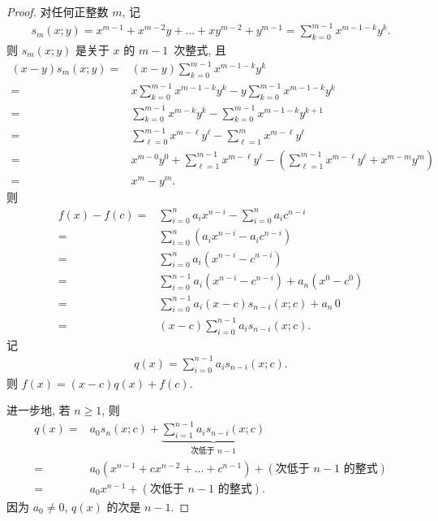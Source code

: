 \documentclass[../libro.tex]{subfiles}
\begin{document}
\begin{proof}
    对任何正整数 \(m\), 记
    \begin{align*}
        s_m (x; y)
        = x^{m-1} + x^{m-2} y + \dots + x y^{m-2} + y^{m-1}
        = \sum_{k = 0}^{m-1} {x^{m-1-k} y^k}.
    \end{align*}
    则 \(s_m (x; y)\) 是关于 \(x\) 的 \(m-1\)~次整式, 且
    \begin{align*}
        (x - y) s_m (x; y)
        = {} &
        (x - y) \sum_{k = 0}^{m-1} {x^{m-1-k} y^k}
        \\
        = {} &
        x \sum_{k = 0}^{m-1} {x^{m-1-k} y^k}
        - y \sum_{k = 0}^{m-1} {x^{m-1-k} y^k}
        \\
        = {} &
        \sum_{k = 0}^{m-1} {x^{m-k} y^k}
        - \sum_{k = 0}^{m-1} {x^{m-1-k} y^{k+1}}
        \\
        = {} &
        \sum_{\ell = 0}^{m-1} {x^{m-\ell} y^\ell}
        - \sum_{\ell = 1}^{m} {x^{m-\ell} y^\ell}
        \\
        = {} &
        x^{m-0} y^0 + \sum_{\ell = 1}^{m-1} {x^{m-\ell} y^\ell}
        - \left(
            \sum_{\ell = 1}^{m-1} {x^{m-\ell} y^\ell} + x^{m-m} y^m
        \right)
        \\
        = {} &
        x^m - y^m.
    \end{align*}
    则
    \begin{align*}
        f(x) - f(c)
        = {} &
        \sum_{i = 0}^{n} {a_i x^{n-i}}
        - \sum_{i = 0}^{n} {a_i c^{n-i}}
        \\
        = {} &
        \sum_{i = 0}^{n} {(a_i x^{n-i} - a_i c^{n-i})}
        \\
        = {} &
        \sum_{i = 0}^{n} {a_i (x^{n-i} - c^{n-i})}
        \\
        = {} &
        \sum_{i = 0}^{n-1} {a_i (x^{n-i} - c^{n-i})}
        + a_n (x^0 - c^0)
        \\
        = {} &
        \sum_{i = 0}^{n-1} {a_i (x - c) s_{n-i} (x; c)}
        + a_n\, 0
        \\
        = {} &
        (x - c)
        \sum_{i = 0}^{n-1} {a_i s_{n-i} (x; c)}.
    \end{align*}
    记
    \begin{align*}
        q(x) = \sum_{i = 0}^{n-1} {a_i s_{n-i} (x; c)}.
    \end{align*}
    则 \(f(x) = (x - c) q(x) + f(c)\).

    进一步地, 若 \(n \geq 1\), 则
    \begin{align*}
        q(x)
        = {} &
        a_0 s_n (x; c)
        + \underbrace{\sum_{i = 1}^{n-1} {a_i s_{n-i} (x; c)}}_{\text{次低于 \(n-1\)}}
        \\
        = {} &
        a_0 (x^{n-1} + c x^{n-2} + \dots + c^{n-1})
        + (\text{次低于 \(n-1\) 的整式})
        \\
        = {} &
        a_0 x^{n-1} + (\text{次低于 \(n-1\) 的整式}).
    \end{align*}
    因为 \(a_0 \neq 0\), \(q(x)\) 的次是 \(n-1\).
\end{proof}
\end{document}

